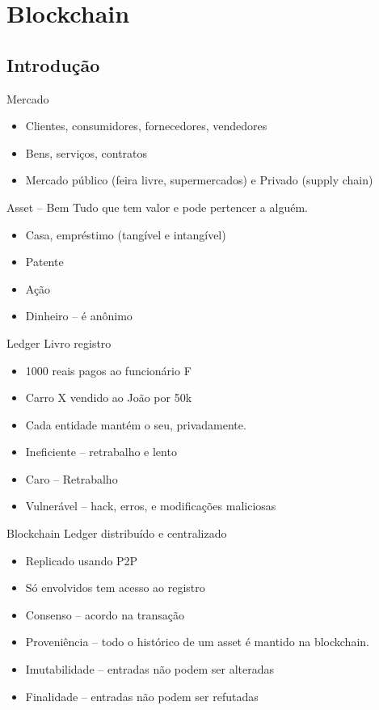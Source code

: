 \section{Blockchain}

\subsection{Introdução}
\begin{frame}{Mercado}
	\begin{itemize}
		\item Clientes, consumidores, fornecedores, vendedores
		\item Bens, serviços, contratos
		\item Mercado público (feira livre, supermercados) e Privado (supply chain)
	\end{itemize}
\end{frame}

\begin{frame}{Asset -- Bem}
	Tudo que tem valor e pode pertencer a alguém.
	\begin{itemize}
		\item Casa, empréstimo (tangível e intangível)
		\item Patente
		\item Ação
		\item Dinheiro -- é anônimo
	\end{itemize}
\end{frame}

\begin{frame}{Ledger}
	Livro registro
	
	\begin{itemize}
		\item 1000 reais pagos ao funcionário F
		\item Carro X vendido ao João por 50k
		\item Cada entidade mantém o seu, privadamente.
		\item Ineficiente -- retrabalho e lento
		\item Caro -- Retrabalho
		\item Vulnerável -- hack, erros, e modificações maliciosas
	\end{itemize}
\end{frame}

\begin{frame}{Blockchain}
Ledger distribuído e centralizado
	\begin{itemize}
		\item Replicado usando P2P
		\item Só envolvidos tem acesso ao registro
		\item Consenso -- acordo na transação
		\item Proveniência -- todo o histórico de um asset é mantido na blockchain.
		\item Imutabilidade -- entradas não podem ser alteradas
		\item Finalidade -- entradas não podem ser refutadas
	\end{itemize}
\end{frame}

